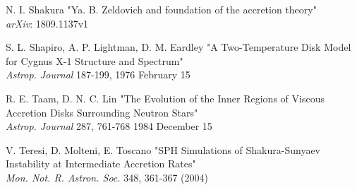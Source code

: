 \documentclass[a4paperbi]{article}
\begin{document}
\begin{thebibliography}{9}
	N. I. Shakura
	"Ya. B. Zeldovich and foundation of the accretion theory"\\
	\textit{arXiv}: 1809.1137v1
	
	S. L. Shapiro, A. P. Lightman, D. M. Eardley 
	"A Two-Temperature Disk Model for Cygnus X-1 Structure and Spectrum"\\
	\textit{Astrop. Journal} 187-199, 1976 February 15
	
	R. E. Taam, D. N. C. Lin 
	"The Evolution of the Inner Regions of Viscous Accretion Disks Surrounding Neutron Stars"\\
	\textit{Astrop. Journal} 287, 761-768 1984 December 15
	
	V. Teresi, D. Molteni, E. Toscano 
	"SPH Simulations of Shakura-Sunyaev Instability at Intermediate Accretion Rates"\\
	\textit{Mon. Not. R. Astron. Soc.} 348, 361-367 (2004)
\end{thebibliography}
\end{document}
